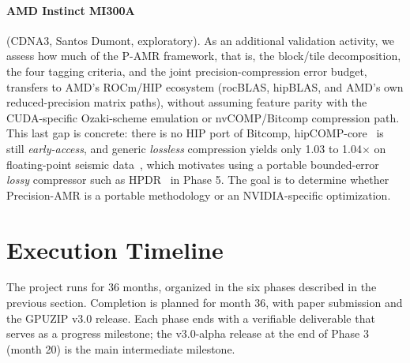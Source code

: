 \documentclass[12pt,a4paper]{article}
\newcommand{\pamr}{P\nobreakdash-AMR}
\begin{document}
\paragraph{AMD Instinct MI300A} (CDNA3, Santos Dumont, exploratory). As an
additional validation activity, we assess how much of the \pamr{}
framework, that is, the block/tile decomposition, the four tagging
criteria, and the joint precision-compression error budget, transfers to
AMD's ROCm/HIP ecosystem (rocBLAS, hipBLAS, and AMD's own
reduced-precision matrix paths), without assuming feature parity with the
CUDA-specific Ozaki-scheme emulation or nvCOMP/Bitcomp compression path.
This last gap is concrete: there is no HIP port of Bitcomp,
hipCOMP-core~\cite{hipcompcore} is still \emph{early-access}, and generic
\emph{lossless} compression yields only 1.03 to 1.04$\times$ on
floating-point seismic data~\cite{kunas2026amdcompression}, which
motivates using a portable bounded-error \emph{lossy} compressor such as
HPDR~\cite{chen2025hpdr} in Phase 5. The goal is to determine whether
Precision-AMR is a portable methodology or an NVIDIA-specific
optimization.

\section{Execution Timeline}

The project runs for 36 months, organized in the six phases described in
the previous section. Completion is planned for month 36, with paper
submission and the GPUZIP v3.0 release. Each phase ends with a verifiable
deliverable that serves as a progress milestone; the v3.0-alpha release at
the end of Phase 3 (month 20) is the main intermediate milestone.
\end{document}
